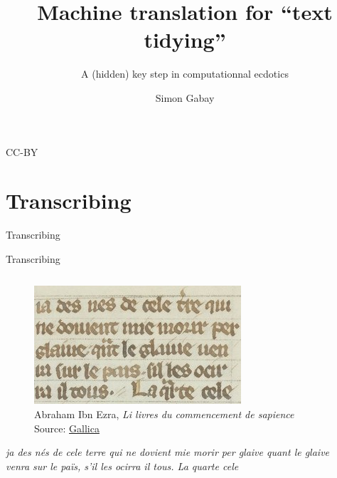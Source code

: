 \documentclass[aspectratio=169]{beamer}
\title{Machine translation for ``text tidying''}
\subtitle{A (hidden) key step in computationnal ecdotics}
\author[S. Gabay]{Simon Gabay \inst{1}}
\institute[VFU]{\inst{1} Université de Genève \\ \texttt{simon.gabay@unige.ch}}
\begin{document}
    \begin{frame}
	\titlepage
	\begin{center}
		  CC-BY
	\end{center}
\end{frame}


    \section{Transcribing}

    \begin{frame}
	\begin{center}
	    Transcribing
	\end{center}
    \end{frame}


    \begin{frame}{Transcribing}
        \begin{columns}[t]
            \begin{column}{.52\textwidth}
                    \vspace{-1.5em}
                    \begin{figure}
                        \centering
			            \includegraphics[width=\textwidth,height=0.6\textheight,keepaspectratio]{nlp-for-ch/images/MA_btv1b10465182x_137.jpeg}
                        \caption{\small Abraham Ibn Ezra, \textit{Li livres du commencement de sapience} \tiny{Source: \href{https://gallica.bnf.fr/ark:/12148/btv1b10465182x/f137.item}{Gallica}}}
                        \label{fig:ibnEzra}
                    \end{figure}
                    
                    \vspace{-1em}
                    \textit{ja des nés de cele terre qui ne dovient mie morir per glaive quant le glaive venra sur le païs, s'il les ocirra il tous. La quarte cele}
            \end{column}
            \begin{column}{.48\textwidth}
            \end{column}
        \end{columns}
    \end{frame}
\end{document}
